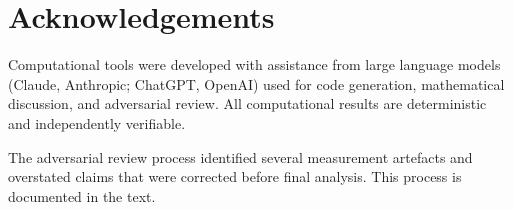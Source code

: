 \documentclass[11pt,a4paper]{article}
\begin{document}

\section*{Acknowledgements}

Computational tools were developed with assistance from large language models (Claude, Anthropic; ChatGPT, OpenAI) used for code generation, mathematical discussion, and adversarial review. All computational results are deterministic and independently verifiable.

The adversarial review process identified several measurement artefacts and overstated claims that were corrected before final analysis. This process is documented in the text.
\end{document}
